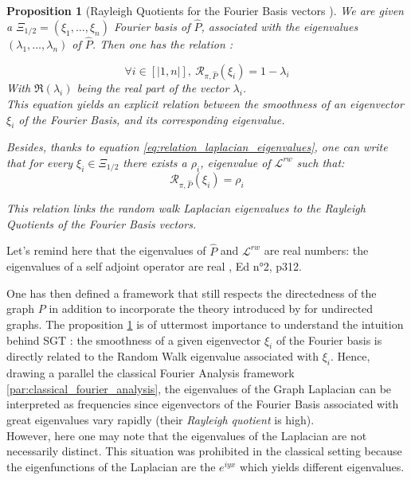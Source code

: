 \documentclass{article}
\newtheorem{prop}{Proposition}[section]
\begin{document}
\begin{prop}[Rayleigh Quotients for the Fourier Basis vectors \cite{sevi2019}]\label{prop:frequencies_rayleigh}
We are given a $\Xi_{1/2} = (\xi_1, \hdots, \xi_n)$ Fourier basis of $\hat{P}$, associated with the eigenvalues $(\lambda_1, \hdots, \lambda_n)$ of $\hat{P}$. Then one has the relation :

\begin{equation}
    \forall i \in [|1, n|], \ \mathcal{R}_{\pi, \hat{P}}(\xi_i) = 1 - \lambda_i
\end{equation}
With $\Re(\lambda_i)$ being the real part of the vector $\lambda_i$.\\
This equation yields an explicit relation between the smoothness of an eigenvector $\xi_i$ of the Fourier Basis, and its corresponding eigenvalue.

Besides, thanks to equation \ref{eq:relation_laplacian_eigenvalues}, one can write that for every $\xi_i \in \Xi_{1/2}$ there exists a $\rho_i$, eigenvalue of $\mathcal{L}^{rw}$ such that:
\begin{equation}
    \mathcal{R}_{\pi, \hat{P}}(\xi_i) = \rho_i
\end{equation}

This relation links the random walk Laplacian eigenvalues to the Rayleigh Quotients of the Fourier Basis vectors.

\end{prop}

Let's remind here that the eigenvalues of $\hat{P}$ and $\mathcal{L}^{rw}$ are real numbers: the eigenvalues of a self adjoint operator are real \cite{hoffman_kunze_1962}, Ed n°2, p312.

One has then defined a framework that still respects the directedness of the graph $P$ in addition to incorporate the theory introduced by \cite{shuman_narang_frossard_ortega_vandergheynst_2013, ricaud_borgnat_tremblay_gonçalves_vandergheynst_2019} for undirected graphs. The proposition \ref{prop:frequencies_rayleigh} is of uttermost importance to understand the intuition behind SGT : the smoothness of a given eigenvector $\xi_i$ of the Fourier basis is directly related to the Random Walk eigenvalue associated with $\xi_i$. Hence, drawing a parallel the classical Fourier Analysis framework \ref{par:classical_fourier_analysis}, the eigenvalues of the Graph Laplacian can be interpreted as frequencies since eigenvectors of the Fourier Basis associated with great eigenvalues vary rapidly (their \textit{Rayleigh quotient} is high).\\
However, here one may note that the eigenvalues of the Laplacian are not necessarily distinct. This situation was prohibited in the classical setting because the eigenfunctions of the Laplacian are the $e^{iyx}$ which yields different eigenvalues.
\end{document}
